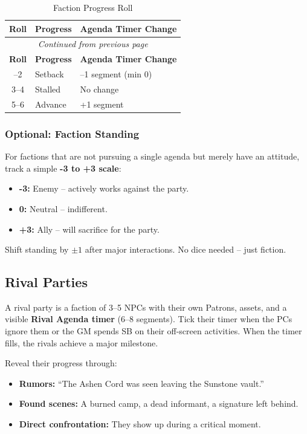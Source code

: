 \begin{tcolorbox}[colback=blue!5!white, colframe=blue!75!black, title=Faction Progress Roll (d6),breakable]
\begin{center}
\begin{longtable}{cll}
\caption{Faction Progress Roll}\\
\toprule
\textbf{Roll} & \textbf{Progress} & \textbf{Agenda Timer Change} \\
\midrule
\endfirsthead
\multicolumn{3}{c}{\emph{Continued from previous page}} \\
\toprule
\textbf{Roll} & \textbf{Progress} & \textbf{Agenda Timer Change} \\
\midrule
\endhead
\bottomrule
\endfoot
1--2 & Setback & --1 segment (min 0) \\
3--4 & Stalled & No change \\
5--6 & Advance & +1 segment \\
\end{longtable}
\end{center}
\end{tcolorbox}

\subsubsection{Optional: Faction Standing}
For factions that are not pursuing a single agenda but merely have an attitude, track a simple \textbf{-3 to +3 scale}:
\begin{itemize}
  \item \textbf{-3:} Enemy -- actively works against the party.
  \item \textbf{0:} Neutral -- indifferent.
  \item \textbf{+3:} Ally -- will sacrifice for the party.
\end{itemize}
Shift standing by $\pm 1$ after major interactions. No dice needed -- just fiction.

\subsection{Rival Parties}

A rival party is a faction of 3--5 NPCs with their own Patrons, assets, and a visible \textbf{Rival Agenda timer} (6--8 segments). Tick their timer when the PCs ignore them or the GM spends SB on their off-screen activities. When the timer fills, the rivals achieve a major milestone.

Reveal their progress through:
\begin{itemize}
  \item \textbf{Rumors:} ``The Ashen Cord was seen leaving the Sunstone vault.''
  \item \textbf{Found scenes:} A burned camp, a dead informant, a signature left behind.
  \item \textbf{Direct confrontation:} They show up during a critical moment.
\end{itemize}

